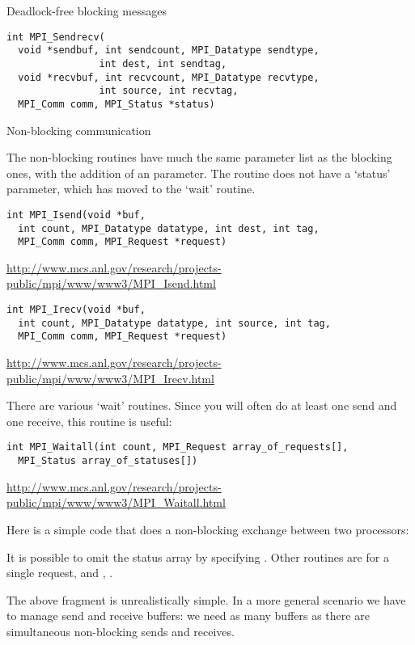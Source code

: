 
 {Deadlock-free blocking messages}

\begin{verbatim}
int MPI_Sendrecv(
  void *sendbuf, int sendcount, MPI_Datatype sendtype, 
                int dest, int sendtag,
  void *recvbuf, int recvcount, MPI_Datatype recvtype, 
                int source, int recvtag,
  MPI_Comm comm, MPI_Status *status)
\end{verbatim}


 {Non-blocking communication}

The non-blocking routines have much the same parameter list as the 
blocking ones, with the addition of an  parameter.
The  routine does not have a `status' parameter,
which has moved to the `wait' routine.
\begin{verbatim}
int MPI_Isend(void *buf,
  int count, MPI_Datatype datatype, int dest, int tag,
  MPI_Comm comm, MPI_Request *request)
\end{verbatim}
\url{http://www.mcs.anl.gov/research/projects-public/mpi/www/www3/MPI_Isend.html}
\begin{verbatim}
int MPI_Irecv(void *buf,
  int count, MPI_Datatype datatype, int source, int tag,
  MPI_Comm comm, MPI_Request *request)
\end{verbatim}
\url{http://www.mcs.anl.gov/research/projects-public/mpi/www/www3/MPI_Irecv.html}

There are various `wait' routines. Since you will often do at least
one send and one receive, this routine is useful:
\begin{verbatim}
int MPI_Waitall(int count, MPI_Request array_of_requests[], 
  MPI_Status array_of_statuses[])
\end{verbatim}
\url{http://www.mcs.anl.gov/research/projects-public/mpi/www/www3/MPI_Waitall.html}

Here is a simple code that does a non-blocking exchange between two processors:

It is possible to omit the status array by specifying .
Other routines are  for a single request, and
, .

The above fragment is unrealistically simple. In a more general scenario we
have to manage send and receive buffers: we need as many buffers as there are
simultaneous non-blocking sends and receives.

